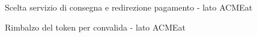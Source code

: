 \documentclass[11pt]{article} %
\begin{document}
\begin{figure}[p]
\begin{center}
\caption{Scelta servizio di consegna e redirezione pagamento - lato ACMEat}
\end{center}
\end{figure}

\begin{figure}[p]
\begin{center}
\caption{Rimbalzo del token per convalida - lato ACMEat}
\end{center}
\end{figure}
\end{document}
